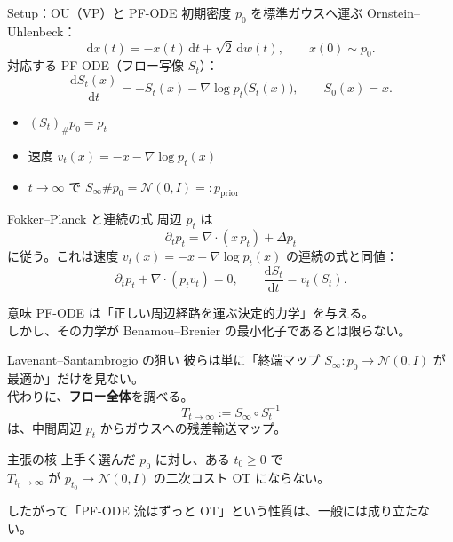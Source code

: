 \asmain
\begin{frame}{Setup：OU（VP）と PF-ODE}
    初期密度 $p_0$ を標準ガウスへ運ぶ Ornstein--Uhlenbeck：
    \[
        \mathrm{d}x(t)=-x(t)\,\mathrm{d}t+\sqrt{2}\,\mathrm{d}w(t),\qquad
        x(0)\sim p_0.
    \]
    対応する PF-ODE（フロー写像 $S_t$）：
    \[
        \frac{\mathrm{d}S_t(x)}{\mathrm{d}t}
        =
        -S_t(x)-\nabla\log p_t\!\bigl(S_t(x)\bigr),\qquad
        S_0(x)=x.
    \]
    \begin{itemize}
        \item $(S_t)_{\#}p_0=p_t$
        \item 速度 $v_t(x)=-x-\nabla\log p_t(x)$
        \item $t\to\infty$ で $S_\infty\#p_0=\mathcal{N}(0,I)=:p_{\mathrm{prior}}$
    \end{itemize}
\end{frame}
\asmain
\begin{frame}{Fokker--Planck と連続の式}
    周辺 $p_t$ は
    \[
        \partial_t p_t=\nabla\cdot(x\,p_t)+\Delta p_t
    \]
    に従う。これは速度 $v_t(x)=-x-\nabla\log p_t(x)$ の連続の式と同値：
    \[
        \partial_t p_t+\nabla\cdot(p_t v_t)=0,\qquad
        \frac{\mathrm{d}S_t}{\mathrm{d}t}=v_t(S_t).
    \]
    \begin{block}{意味}
        PF-ODE は「正しい周辺経路を運ぶ決定的力学」を与える。\\
        しかし、その力学が Benamou--Brenier の最小化子であるとは限らない。
    \end{block}
\end{frame}
\asmain
\begin{frame}{Lavenant--Santambrogio の狙い}
    彼らは単に「終端マップ $S_\infty:p_0\to\mathcal{N}(0,I)$ が最適か」だけを見ない。\\
    代わりに、\textbf{フロー全体}を調べる。
    \[
        T_{t\to\infty}:=S_\infty\circ S_t^{-1}
    \]
    は、中間周辺 $p_t$ からガウスへの残差輸送マップ。
    \begin{alertblock}{主張の核}
        上手く選んだ $p_0$ に対し、ある $t_0\ge 0$ で\\
        $T_{t_0\to\infty}$ が $p_{t_0}\to\mathcal{N}(0,I)$ の二次コスト OT にならない。
    \end{alertblock}
    \footnotesize
    したがって「PF-ODE 流はずっと OT」という性質は、一般には成り立たない。
\end{frame}
